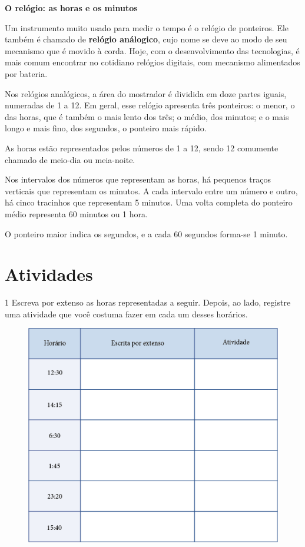 {\textbf{O relógio: as horas e os minutos}\bigskip

Um instrumento muito usado para medir o tempo é o relógio de ponteiros. 
Ele também é chamado de \textbf{relógio análogico}, cujo nome se deve 
ao modo de seu mecanismo que é movido à corda. 
Hoje, com o desenvolvimento das tecnologias, é mais comum encontrar no cotidiano 
relógios digitais, com mecanismo alimentados por bateria.  

Nos relógios analógicos, a área do mostrador é dividida em doze partes iguais, 
numeradas de 1 a 12. Em geral, esse relógio apresenta três ponteiros:
o menor, o das horas, que é também o mais lento dos três; o médio, dos minutos; 
e o mais longo e mais fino, dos segundos, o ponteiro mais rápido. 

As horas estão representados pelos números de 1 a 12, 
sendo 12 comumente chamado de meio-dia ou meia-noite. 

Nos intervalos dos números que representam as horas, há pequenos traços verticais
que representam os minutos. A cada intervalo entre um número e outro, há cinco tracinhos
que representam 5 minutos. Uma volta completa do ponteiro médio
representa 60 minutos ou 1 hora.

O ponteiro maior indica os segundos, e a cada 60 segundos forma-se 1 minuto.
}

\pagebreak
\section*{Atividades} 

\num{1} Escreva por extenso as horas representadas a seguir. Depois, ao lado, registre uma atividade que você costuma fazer em cada um desses horários.

\begin{figure}[htpb!]
\centering
\includegraphics[width=\textwidth]{media/image28.png}
\end{figure}

